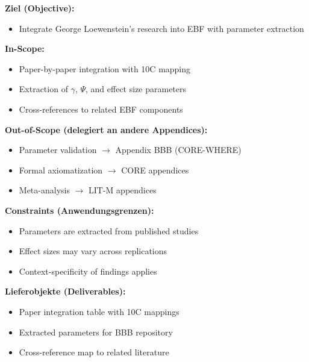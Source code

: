 
\begin{tcolorbox}[
    colback=orange!5!white,
    colframe=orange!75!black,
    title={\textbf{Appendix Scope: Ziel / In-Scope / Out-of-Scope / Constraints}},
    fonttitle=\bfseries
]

\textbf{Ziel (Objective):}
\begin{itemize}[nosep]
    \item Integrate George Loewenstein's research into EBF with parameter extraction
\end{itemize}

\textbf{In-Scope:}
\begin{itemize}[nosep]
    \item Paper-by-paper integration with 10C mapping
    \item Extraction of $\gamma$, $\Psi$, and effect size parameters
    \item Cross-references to related EBF components
\end{itemize}

\textbf{Out-of-Scope (delegiert an andere Appendices):}
\begin{itemize}[nosep]
    \item Parameter validation $\rightarrow$ Appendix BBB (CORE-WHERE)
    \item Formal axiomatization $\rightarrow$ CORE appendices
    \item Meta-analysis $\rightarrow$ LIT-M appendices
\end{itemize}

\textbf{Constraints (Anwendungsgrenzen):}
\begin{itemize}[nosep]
    \item Parameters are extracted from published studies
    \item Effect sizes may vary across replications
    \item Context-specificity of findings applies
\end{itemize}

\textbf{Lieferobjekte (Deliverables):}
\begin{itemize}[nosep]
    \item Paper integration table with 10C mappings
    \item Extracted parameters for BBB repository
    \item Cross-reference map to related literature
\end{itemize}

\end{tcolorbox}

